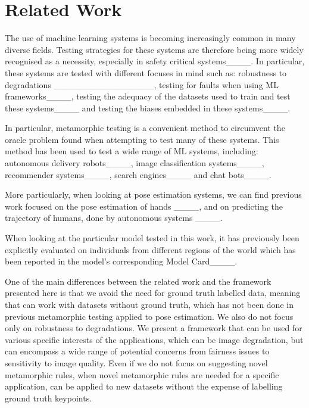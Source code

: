 \section{Related Work}
\label{sec:rw}

The use of machine learning systems is becoming increasingly common in many diverse fields. Testing strategies for these systems are therefore being more widely recognised as a necessity, especially in safety critical systems____. In particular, these systems are tested with different focuses in mind such as: robustness to degradations ________________, testing for faults when using ML frameworks____, testing the adequacy of the datasets used to train and test these systems____ and testing the biases embedded in these systems____.

In particular, metamorphic testing is a convenient method to circumvent the oracle problem found when attempting to test many of these systems. This method has been used to test a wide range of ML systems, including: autonomous delivery robots____, image classification systems____, recommender systems____, search engines____ and chat bots____.

More particularly, when looking at pose estimation systems, we can find previous work focused on the pose estimation of hands ____, and on predicting the trajectory of humans, done by autonomous systems ____.

When looking at the particular model tested in this work, it has previously been explicitly evaluated on individuals from different regions of the world which has been reported in the model's corresponding Model Card____. 

One of the main differences between the related work and the framework presented here is that we avoid the need for ground truth labelled data, meaning that \proposed can work with datasets without ground truth, which has not been done in previous metamorphic testing applied to pose estimation. We also do not focus only on robustness to degradations. We present a framework that can be used for various specific interests of the applications, which can be image degradation, but can encompass a wide range of potential concerns from fairness issues to sensitivity to image quality. Even if we do not focus on suggesting novel metamorphic rules, when novel metamorphic rules are needed for a specific application, \proposed can be applied to new datasets without the expense of labelling ground truth keypoints.